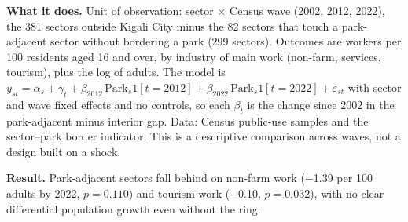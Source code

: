 \documentclass[11pt]{article}
\begin{document}
\textbf{What it does.} Unit of observation: sector $\times$ Census wave (2002, 2012, 2022), the 381 sectors outside Kigali City minus the 82 sectors that touch a park-adjacent sector without bordering a park (299 sectors). Outcomes are workers per 100 residents aged 16 and over, by industry of main work (non-farm, services, tourism), plus the log of adults. The model is $y_{st} = \alpha_s + \gamma_t + \beta_{2012}\,\mathrm{Park}_s 1[t{=}2012] + \beta_{2022}\,\mathrm{Park}_s 1[t{=}2022] + \varepsilon_{st}$ with sector and wave fixed effects and no controls, so each $\beta_t$ is the change since 2002 in the park-adjacent minus interior gap. Data: Census public-use samples and the sector--park border indicator. This is a descriptive comparison across waves, not a design built on a shock.

\textbf{Result.} Park-adjacent sectors fall behind on non-farm work ($-$1.39 per 100 adults by 2022, $p=0.110$) and tourism work ($-$0.10, $p=0.032$), with no clear differential population growth even without the ring.
\clearpage
\end{document}
